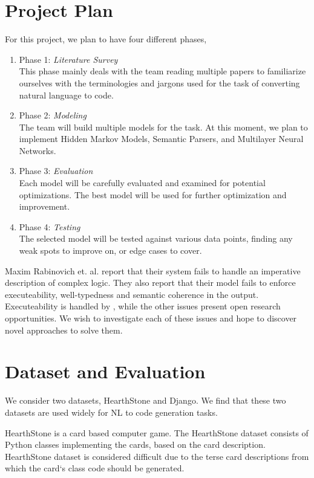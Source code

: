 \documentclass{IEEEtran}
\begin{document}
    \section{Project Plan}
    For this project, we plan to have four different phases,
    \begin{enumerate}
        \item Phase 1: \textit{Literature Survey} \\
            This phase mainly deals with the team reading multiple papers to familiarize ourselves
            with the terminologies and jargons used for the task of converting natural language 
            to code.
        \item Phase 2: \textit{Modeling} \\
            The team will build multiple models for the task. At this moment, we plan to 
            implement Hidden Markov Models, Semantic Parsers, and Multilayer Neural Networks.
        \item Phase 3: \textit{Evaluation} \\
            Each model will be carefully evaluated and examined for potential optimizations.
            The best model will be used for further optimization and improvement.
        \item Phase 4: \textit{Testing} \\
            The selected model will be tested against various data points, finding any weak 
            spots to improve on, or edge cases to cover.
    \end{enumerate}

    Maxim Rabinovich et. al. report that their system fails to handle an imperative description 
    of complex logic. They also report that their model fails to enforce executeability, 
    well-typedness and semantic coherence in the output. Executeability is handled by 
    \cite{yin2017syntactic}, while the other issues present open research opportunities. We 
    wish to investigate each of these issues and hope to discover novel approaches to solve them.

    \section{Dataset and Evaluation}
    We consider two datasets, HearthStone and Django. We find that these two datasets are 
    used widely for NL to code generation tasks.

    HearthStone is a card based computer game. The HearthStone dataset consists of Python classes 
    implementing the cards, based on the card description. HearthStone dataset is considered 
    difficult due to the terse card descriptions from which the card`s class code should be 
    generated. 
\end{document}
